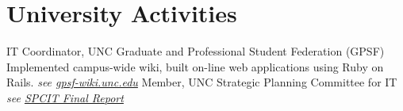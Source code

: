\section{University Activities}
		{IT Coordinator, UNC Graduate and Professional Student Federation (GPSF)\newline
			\small
			Implemented campus-wide wiki, built on-line web applications using Ruby on Rails.
			\hfill{\itshape\color{see}\footnotesize{}see 
			\href{http://gpsf-wiki.unc.edu}{gpsf-wiki.unc.edu}}
		}
		{Member, UNC Strategic Planning Committee for IT
			\hfill{\itshape\color{see}\footnotesize{}see 
			\href{http://its.unc.edu/ccm/groups/assets/documents/content/doc_its_2007_strategic_plan.pdf}{SPCIT Final Report}}
		}
